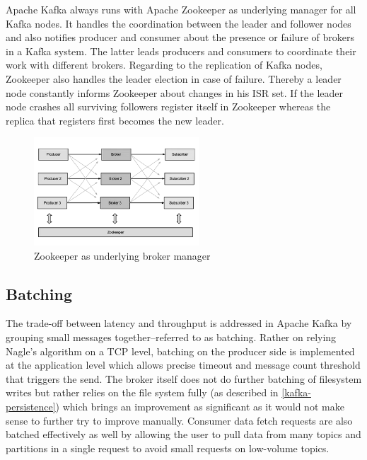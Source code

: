 Apache Kafka always runs with Apache Zookeeper  as underlying manager for all
Kafka nodes. It handles the coordination between the leader and follower nodes
and also notifies producer and consumer about the presence or failure of brokers in a
Kafka system. The latter leads producers and consumers to coordinate their work
with different brokers. Regarding to the replication of Kafka nodes, Zookeeper
also handles the leader election in case of failure. Thereby a leader node
constantly informs Zookeeper about changes in his ISR set. If the leader node
crashes all surviving followers register itself in Zookeeper whereas
the replica that registers first becomes the new leader.
\cite{kafka-wiki-replication} \cite{ArtKafkaInfoQ}

\begin{figure}[H]
    \centering
    \includegraphics[width=0.55\textwidth]{images/kafka-replication-zookeeper.png}
    \caption{Zookeeper as underlying broker manager \cite{ArtKafkaInfoQ}}
    \label{fig:the-log}
\end{figure}


\subsection{Batching}
\label{intro-kafka-components-batching}

The trade-off between latency and throughput is addressed in Apache Kafka by
grouping small messages together--referred to as batching. Rather on relying
Nagle's algorithm on a TCP level, batching on the producer side is implemented
at the application level which allows precise timeout and message count
threshold that triggers the send. The broker itself does not do further batching
of filesystem writes but rather relies on the file system fully (as described in
\ref{kafka-persistence}) which brings an improvement as significant as it would
not make sense to further try to improve manually. Consumer data fetch requests
are also batched effectively as well by allowing the user to pull data from many
topics and partitions in a single request to avoid small requests on low-volume
topics. \cite{goodhope2012building}

